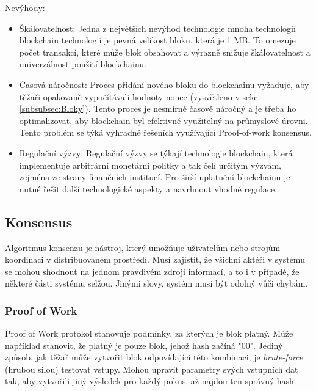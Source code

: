 Nevýhody:

\begin{itemize}
	
	\item Škálovatelnost: Jedna z největších nevýhod technologie mnoha technologií blockchain technologií je pevná velikost bloku, která je 1 MB. To omezuje počet transakcí, které může blok obsahovat a výrazně snižuje škálovatelnost a univerzálnost použití blockchainu.
	
	
	\item Časová náročnost: Proces přidání nového bloku do blockchainu vyžaduje, aby těžaři opakovaně vypočítávali hodnoty nonce (vysvětleno v sekci \ref{subsubsec:Bloky}). Tento proces je nesmírně časově náročný a je třeba ho optimalizovat, aby blockchain byl efektivně využitelný na průmyslové úrovni. Tento problém se týká výhradně řešeních využívající Proof-of-work konsensus.
	
	
	\item Regulační výzvy: Regulační výzvy se týkají technologie blockchain, která implementuje arbitrární monetární politky a tak čelí určitým výzvám, zejména ze strany finančních institucí. Pro širší uplatnění blockchainu je nutné řešit další technologické aspekty a navrhnout vhodné regulace.  \cite{Výhody-a-nevýhody-BC}
	
	
\end{itemize}



\subsection{Konsensus}\label{subsec:Konsensus}

Algoritmus konsenzu je nástroj, který umožňuje uživatelům nebo strojům koordinaci v distribuovaném prostředí. Musí zajistit, že všichni aktéři v systému se mohou shodnout na jednom pravdivém zdroji informací, a to i v případě, že některé části systému selžou. Jinými slovy, systém musí být odolný vůči chybám. \cite{Konsensus}


\subsubsection{Proof of Work}\label{subsubsec:PoW}

Proof of Work protokol stanovuje podmínky, za kterých je blok platný. Může například stanovit, že platný je pouze blok, jehož hash začíná "00". Jediný způsob, jak těžař může vytvořit blok odpovídající této kombinaci, je \textit{brute-force} (hrubou silou) testovat vstupy. Mohou upravit parametry svých vstupních dat tak, aby vytvořili jiný výsledek pro každý pokus, až najdou ten správný hash.

